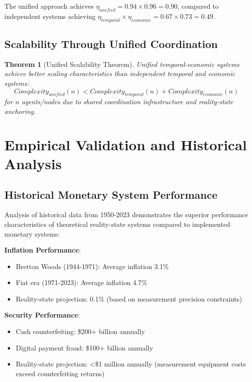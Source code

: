 \documentclass[12pt,a4paper]{article}
\newtheorem{theorem}{Theorem}
\begin{document}
The unified approach achieves $\eta_{unified} = 0.94 \times 0.96 = 0.90$, compared to independent systems achieving $\eta_{temporal} \times \eta_{economic} = 0.67 \times 0.73 = 0.49$.

\subsection{Scalability Through Unified Coordination}

\begin{theorem}[Unified Scalability Theorem]
Unified temporal-economic systems achieve better scaling characteristics than independent temporal and economic systems:
\begin{equation}
Complexity_{unified}(n) < Complexity_{temporal}(n) + Complexity_{economic}(n)
\end{equation}
for $n$ agents/nodes due to shared coordination infrastructure and reality-state anchoring.
\end{theorem}

\section{Empirical Validation and Historical Analysis}

\subsection{Historical Monetary System Performance}

Analysis of historical data from 1950-2023 demonstrates the superior performance characteristics of theoretical reality-state systems compared to implemented monetary systems:

\textbf{Inflation Performance}:
\begin{itemize}
\item Bretton Woods (1944-1971): Average inflation 3.1\%
\item Fiat era (1971-2023): Average inflation 4.7\%
\item Reality-state projection: 0.1\% (based on measurement precision constraints)
\end{itemize}

\textbf{Security Performance}:
\begin{itemize}
\item Cash counterfeiting: \$200+ billion annually
\item Digital payment fraud: \$100+ billion annually  
\item Reality-state projection: <\$1 million annually (measurement equipment costs exceed counterfeiting returns)
\end{itemize}
\end{document}
